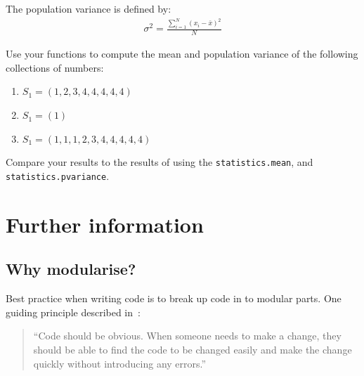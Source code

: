 \begin{enumerate}
The population variance is defined by:
\begin{equation*}
\begin{split}
    \sigma ^ 2 = \frac{\sum_{i=1}^{N} (x_i - \bar x) ^ 2}{N}
   \end{split}
\end{equation*}

Use your functions to compute the mean and population variance of the following
collections of numbers:
\begin{enumerate}

\item 

\(S_1=(1, 2, 3, 4, 4, 4, 4, 4)\)

\item 

\(S_1=(1)\)

\item 

\(S_1=(1, 1, 1, 2, 3, 4, 4, 4, 4, 4)\)

\end{enumerate}


Compare your results to the results of using the \texttt{statistics.mean},
and \texttt{statistics.pvariance}. 

\end{enumerate}



\section{Further information}
\label{\detokenize{building-tools/05-modularisation/why/main:further-information}}\label{\detokenize{building-tools/05-modularisation/why/main::doc}}

\subsection{Why modularise?}
\label{\detokenize{building-tools/05-modularisation/why/main:why-modularise}}\label{\detokenize{building-tools/05-modularisation/why/main:id1}}

Best practice when writing code is to break up code in to modular parts. One
guiding principle described in~\cite{fowler2018refactoring}:




\begin{quote}


``Code should be obvious. When someone needs to make a change, they should be
able to find the code to be changed easily and make the change quickly without
introducing any errors.''
\end{quote}






